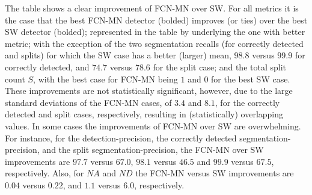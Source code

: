 \documentclass[a4paper,authoryear,review]{elsarticle}
\begin{document}
The table shows a clear improvement of FCN-MN over SW. For all metrics it is the case that the best  FCN-MN detector (bolded) improves (or ties) over the best SW detector (bolded); represented in the table by underlying the one with better metric; with the exception of the two segmentation recalls (for correctly detected and splits) for which the SW case has a better (larger) mean, $98.8$ versus $99.9$ for correctly detected, and $74.7$ versus $78.6$ for the split case; and the total split count $S$, with the best case for FCN-MN being $1$ and $0$ for the best SW case. These improvements are not statistically significant, however, due to the large standard deviations of the FCN-MN cases, of $3.4$ and $8.1$, for the correctly detected and split cases, respectively,  resulting in (statistically) overlapping values. 
%
In some cases the improvements of FCN-MN over SW are overwhelming. For instance, for the detection-precision, the correctly detected segmentation-precision, and the split segmentation-precision, the FCN-MN over SW improvements are $97.7$ versus $67.0$, $98.1$ versus $46.5$ and $99.9$ versus $67.5$, respectively.  Also, for $NA$ and $ND$ the  FCN-MN versus SW improvements are $0.04$ versus $0.22$, and $1.1$ versus $6.0$, respectively.
\end{document}
